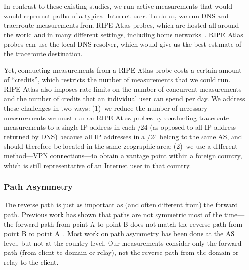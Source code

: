 In contrast to these existing studies, we run active measurements that
would would represent paths of a typical Internet user. To do so, we run
DNS and traceroute measurements from RIPE Atlas probes, which are hosted
all around the world and in many different settings, including home
networks~\cite{ripe_atlas}.  RIPE Atlas probes can use the local DNS
resolver, which would give us the best estimate of the traceroute
destination.

Yet, conducting measurements from a RIPE Atlas probe costs a certain
amount of ``credits'', which restricts the number of measurements that we
could run.  RIPE Atlas also imposes rate limits on the number of
concurrent measurements and the number of credits that an individual
user can spend per day.  We address these challenges in two ways: (1)~we
reduce the number of necessary measurements we must run on RIPE Atlas
probes by conducting traceroute measurements to a single IP address in
each /24 (as opposed to all IP address returned by DNS) because all IP
addresses in a /24 belong to the same AS, and should therefore be
located in the same geographic area; (2)~we use a different method---VPN
connections---to obtain a vantage point within a foreign country, which
is still representative of an Internet user in that country.

\subsubsection{Path Asymmetry}
\label{path_sym}

The reverse path is just as important as (and often different from) the 
forward path.  
Previous work has shown that paths are not symmetric most of the
time---the forward path from point A to point B does not match the
reverse path from point B to point A~\cite{he2005routing}.  Most work on
path asymmetry has been done at the AS level, but not at the country
level.  Our measurements consider only the forward path (from client
to domain or relay), not the reverse path from the domain or
relay to the client.   

